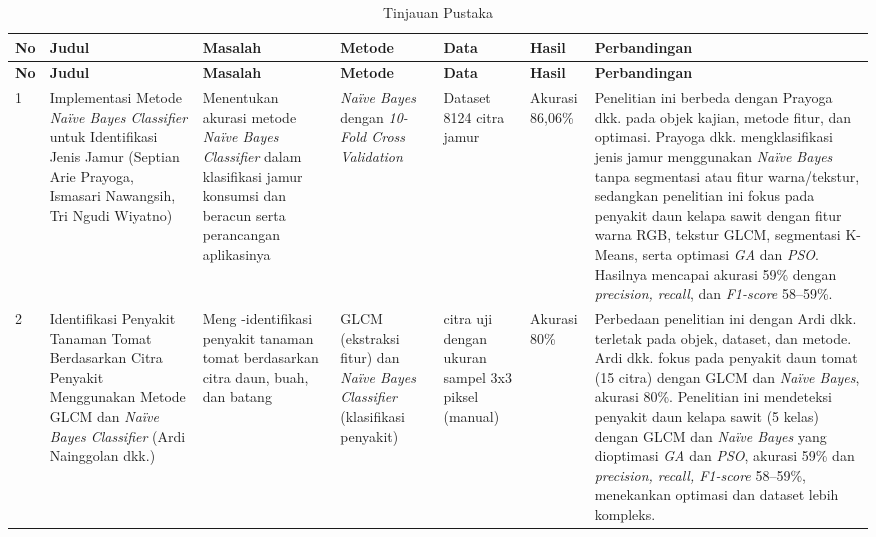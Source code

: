 {
\renewcommand{\arraystretch}{1.0}
\setlength{\tabcolsep}{3pt}
\fontsize{9pt}{10pt}\selectfont  %
\begin{longtable}{|>{\centering\arraybackslash}p{}|
                  >{\raggedright\arraybackslash}p{}|
                  >{\raggedright\arraybackslash}p{}|
                  >{\raggedright\arraybackslash}p{}|
                  >{\raggedright\arraybackslash}p{}|
                  >{\centering\arraybackslash}p{}|
                  >{\raggedright\arraybackslash}p{}|}

\caption{Tinjauan Pustaka} \label{Table:2. Tinjauan Pustaka} \\
\hline
\textbf{No} & \textbf{Judul} & \textbf{Masalah} & \textbf{Metode} & \textbf{Data} & \textbf{Hasil} & \textbf{Perbandingan} \\
\hline
\endfirsthead

\hline
\textbf{No} & \textbf{Judul} & \textbf{Masalah} & \textbf{Metode} & \textbf{Data} & \textbf{Hasil} & \textbf{Perbandingan} \\
\hline
\endhead

1 & Implementasi Metode \textit{Naïve Bayes Classifier} untuk Identifikasi Jenis Jamur (Septian Arie Prayoga, Ismasari Nawangsih, Tri Ngudi Wiyatno) & Menentukan akurasi metode \textit{Naïve Bayes Classifier} dalam klasifikasi jamur konsumsi dan beracun serta perancangan aplikasinya & \textit{Naïve Bayes} dengan \textit{10-Fold Cross Validation} & Dataset 8124 citra jamur & Akurasi 86,06\% & Penelitian ini berbeda dengan Prayoga dkk. pada objek kajian, metode fitur, dan optimasi. Prayoga dkk. mengklasifikasi jenis jamur menggunakan \textit{Naïve Bayes} tanpa segmentasi atau fitur warna/tekstur, sedangkan penelitian ini fokus pada penyakit daun kelapa sawit dengan fitur warna RGB, tekstur GLCM, segmentasi K-Means, serta optimasi \textit{GA} dan \textit{PSO}. Hasilnya mencapai akurasi 59\% dengan \textit{precision, recall}, dan \textit{F1-score} 58–59\%.\\
\hline

2 & Identifikasi Penyakit Tanaman Tomat Berdasarkan Citra Penyakit Menggunakan Metode GLCM dan \textit{Naïve Bayes Classifier} (Ardi Nainggolan dkk.) & Meng -identifikasi penyakit tanaman tomat berdasarkan citra daun, buah, dan batang & GLCM (ekstraksi fitur) dan \textit{Naïve Bayes Classifier} (klasifikasi penyakit) & 15 citra uji dengan ukuran sampel 3x3 piksel (manual) & Akurasi 80\% & Perbedaan penelitian ini dengan Ardi dkk. terletak pada objek, dataset, dan metode. Ardi dkk. fokus pada penyakit daun tomat (15 citra) dengan GLCM dan \textit{Naïve Bayes}, akurasi 80\%. Penelitian ini mendeteksi penyakit daun kelapa sawit (5 kelas) dengan GLCM dan \textit{Naïve Bayes} yang dioptimasi \textit{GA} dan \textit{PSO}, akurasi 59\% dan \textit{precision, recall, F1-score} 58–59\%, menekankan optimasi dan dataset lebih kompleks.\\
\hline


\end{longtable}}
